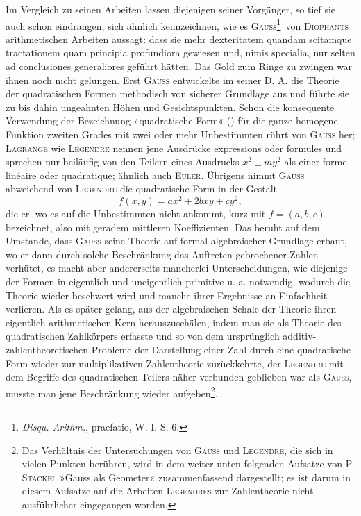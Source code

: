 Im Vergleich zu seinen Arbeiten lassen diejenigen seiner Vorgänger, so tief sie auch schon eindrangen, sich ähnlich kennzeichnen, wie es \textsc{Gauss}\begingroup\renewcommand{\thefootnote}{\ensuremath{\dagger\dagger\dagger})}\footnote{\textit{Disqu. Arithm.}, praefatio, W. I, S. 6.}\endgroup\ von \textsc{Diophants} arithmetischen Arbeiten aussagt: dass sie mehr dexteritatem quandam scitamque tractationem quam principia profundiora gewiesen und, nimis specialia, nur selten ad conclusiones generaliores geführt hätten. Das Gold zum Ringe zu zwingen war ihnen noch nicht gelungen. Erst \textsc{Gauss} entwickelte im  seiner D. A. die Theorie der quadratischen Formen methodisch von sicherer Grundlage aus und führte sie zu bis dahin ungeahnten Höhen und Gesichtspunkten. Schon die konsequente Verwendung der Bezeichnung »quadratische Form« () für die ganze homogene Funktion zweiten Grades mit zwei oder mehr Unbestimmten rührt von \textsc{Gauss} her; \textsc{Lagrange} wie \textsc{Legendre} nennen jene Ausdrücke expressions oder formules und sprechen nur beiläufig von den Teilern eines Ausdrucks \(x^2\pm my^2\) als einer forme linéaire oder quadratique; ähnlich auch \textsc{Euler}. Übrigens nimmt \textsc{Gauss} abweichend von \textsc{Legendre} die quadratische Form in
\newpage{}
\noindent der Gestalt
\[
f(x,y)=ax^2+2bxy+cy^2,
\]
die er, wo es auf die Unbestimmten nicht ankommt, kurz mit \(f=(a,b,c)\) bezeichnet, also mit geradem mittleren Koeffizienten. Das beruht auf dem Umstande, dass \textsc{Gauss} seine Theorie auf formal algebraischer Grundlage erbaut, wo er dann durch solche Beschränkung das Auftreten gebrochener Zahlen verhütet, es macht aber andererseits mancherlei Unterscheidungen, wie diejenige der Formen in eigentlich und uneigentlich primitive u. a. notwendig, wodurch die Theorie wieder beschwert wird und manche ihrer Ergebnisse an Einfachheit verlieren. Als es später gelang, aus der algebraischen Schale der Theorie ihren eigentlich arithmetischen Kern herauszuschälen, indem man sie als Theorie des quadratischen Zahlkörpers erfasste und so von dem ursprünglich additiv-zahlentheoretischen Probleme der Darstellung einer Zahl durch eine quadratische Form wieder zur multiplikativen Zahlentheorie zurückkehrte, der \textsc{Legendre} mit dem Begriffe des quadratischen Teilers näher verbunden geblieben war als \textsc{Gauss}, musste man jene Beschränkung wieder aufgeben\footnote{Das Verhältnis der Untersuchungen von \textsc{Gauss} und \textsc{Legendre}, die sich in vielen Punkten berühren, wird in dem weiter unten folgenden Aufsatze von P. \textsc{Stäckel} »Gauss als Geometer« zusammenfassend dargestellt; es ist darum in diesem Aufsatze auf die Arbeiten \textsc{Legendres} zur Zahlentheorie nicht ausführlicher eingegangen worden.}.
